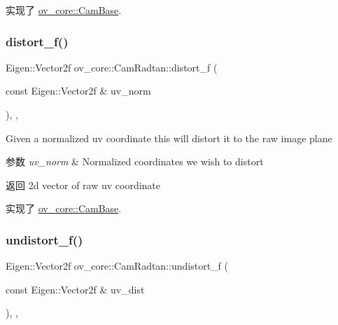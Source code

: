 实现了 \hyperlink{classov__core_1_1CamBase_a498fa2b56be008d7b59bf9927f60d5db}{ov\+\_\+core\+::\+Cam\+Base}.

\mbox{\label{classov__core_1_1CamRadtan_a022376b5a15b827bbb7dabebc8df0508}} 
\subsubsection{\texorpdfstring{distort\+\_\+f()}{distort\_f()}}
{\footnotesize\ttfamily Eigen\+::\+Vector2f ov\+\_\+core\+::\+Cam\+Radtan\+::distort\+\_\+f (\begin{DoxyParamCaption}\item[{const Eigen\+::\+Vector2f \&}]{uv\+\_\+norm }\end{DoxyParamCaption})\hspace{0.3cm}{\ttfamily [inline]}, {\ttfamily [override]}, {\ttfamily [virtual]}}



Given a normalized uv coordinate this will distort it to the raw image plane 


\begin{DoxyParams}{参数}
{\em uv\+\_\+norm} & Normalized coordinates we wish to distort \\
\hline
\end{DoxyParams}
\begin{DoxyReturn}{返回}
2d vector of raw uv coordinate 
\end{DoxyReturn}


实现了 \hyperlink{classov__core_1_1CamBase_a00902793219107474dc21f762fb14556}{ov\+\_\+core\+::\+Cam\+Base}.

\mbox{\label{classov__core_1_1CamRadtan_af02fa84ed2fdc895aaaf216184aa25ef}} 
\subsubsection{\texorpdfstring{undistort\+\_\+f()}{undistort\_f()}}
{\footnotesize\ttfamily Eigen\+::\+Vector2f ov\+\_\+core\+::\+Cam\+Radtan\+::undistort\+\_\+f (\begin{DoxyParamCaption}\item[{const Eigen\+::\+Vector2f \&}]{uv\+\_\+dist }\end{DoxyParamCaption})\hspace{0.3cm}{\ttfamily [inline]}, {\ttfamily [override]}, {\ttfamily [virtual]}}



